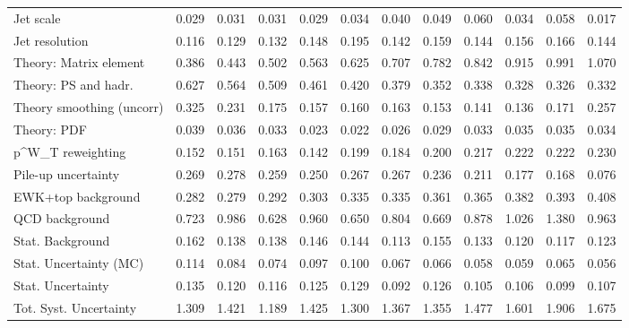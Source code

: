\begin{tabular}{l|p{0.6cm}p{0.6cm}p{0.6cm}p{0.6cm}p{0.6cm}p{0.6cm}p{0.6cm}p{0.6cm}p{0.6cm}p{0.6cm}p{0.6cm}}
Jet scale                                & 0.029 & 0.031 & 0.031 & 0.029 & 0.034 & 0.040 & 0.049 & 0.060 & 0.034 & 0.058 & 0.017 \\
Jet resolution                           & 0.116 & 0.129 & 0.132 & 0.148 & 0.195 & 0.142 & 0.159 & 0.144 & 0.156 & 0.166 & 0.144 \\
Theory: Matrix element                   & 0.386 & 0.443 & 0.502 & 0.563 & 0.625 & 0.707 & 0.782 & 0.842 & 0.915 & 0.991 & 1.070 \\
Theory: PS and hadr.                     & 0.627 & 0.564 & 0.509 & 0.461 & 0.420 & 0.379 & 0.352 & 0.338 & 0.328 & 0.326 & 0.332 \\
Theory smoothing (uncorr)                & 0.325 & 0.231 & 0.175 & 0.157 & 0.160 & 0.163 & 0.153 & 0.141 & 0.136 & 0.171 & 0.257 \\
Theory: PDF                              & 0.039 & 0.036 & 0.033 & 0.023 & 0.022 & 0.026 & 0.029 & 0.033 & 0.035 & 0.035 & 0.034 \\
p^{W}_{T} reweighting                    & 0.152 & 0.151 & 0.163 & 0.142 & 0.199 & 0.184 & 0.200 & 0.217 & 0.222 & 0.222 & 0.230 \\
Pile-up uncertainty                      & 0.269 & 0.278 & 0.259 & 0.250 & 0.267 & 0.267 & 0.236 & 0.211 & 0.177 & 0.168 & 0.076 \\
EWK+top background                       & 0.282 & 0.279 & 0.292 & 0.303 & 0.335 & 0.335 & 0.361 & 0.365 & 0.382 & 0.393 & 0.408 \\
QCD background                           & 0.723 & 0.986 & 0.628 & 0.960 & 0.650 & 0.804 & 0.669 & 0.878 & 1.026 & 1.380 & 0.963 \\
Stat. Background                         & 0.162 & 0.138 & 0.138 & 0.146 & 0.144 & 0.113 & 0.155 & 0.133 & 0.120 & 0.117 & 0.123 \\
Stat. Uncertainty (MC)                   & 0.114 & 0.084 & 0.074 & 0.097 & 0.100 & 0.067 & 0.066 & 0.058 & 0.059 & 0.065 & 0.056 \\
\hline
Stat. Uncertainty                        & 0.135 & 0.120 & 0.116 & 0.125 & 0.129 & 0.092 & 0.126 & 0.105 & 0.106 & 0.099 & 0.107 \\
\hline
Tot. Syst. Uncertainty                   & 1.309 & 1.421 & 1.189 & 1.425 & 1.300 & 1.367 & 1.355 & 1.477 & 1.601 & 1.906 & 1.675 \\
\hline
\end{tabular}
